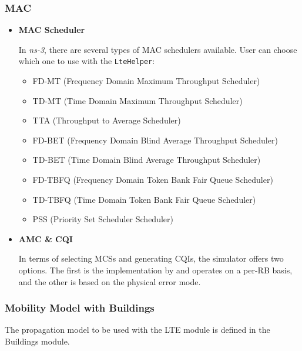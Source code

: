\subsubsection{MAC}
\begin{itemize}
  \item \textbf{MAC Scheduler}
  
  In \textit{ns-3}, there are several types of MAC schedulers available. User can choose which 
  one to use with the \texttt{LteHelper}:

  \begin{itemize}[noitemsep, topsep=0pt]
    \item FD-MT (Frequency Domain Maximum Throughput Scheduler) 
    \item TD-MT (Time Domain Maximum Throughput Scheduler) 
    \item TTA (Throughput to Average Scheduler) 
    \item FD-BET (Frequency Domain Blind Average Throughput Scheduler) 
    \item TD-BET (Time Domain Blind Average Throughput Scheduler) 
    \item FD-TBFQ (Frequency Domain Token Bank Fair Queue Scheduler) 
    \item TD-TBFQ (Time Domain Token Bank Fair Queue Scheduler) 
    \item PSS (Priority Set Scheduler Scheduler) 
  \end{itemize}



  \item \textbf{AMC \& CQI}
  
  In terms of selecting MCSs and generating CQIs, the simulator offers two options. 
  The first is the implementation by \cite{piro} and operates on a per-RB basis, and the other 
  is based on the physical error mode.

\end{itemize}


\subsubsection{Mobility Model with Buildings}
The propagation model to be used with the LTE module is defined in the
Buildings module.

